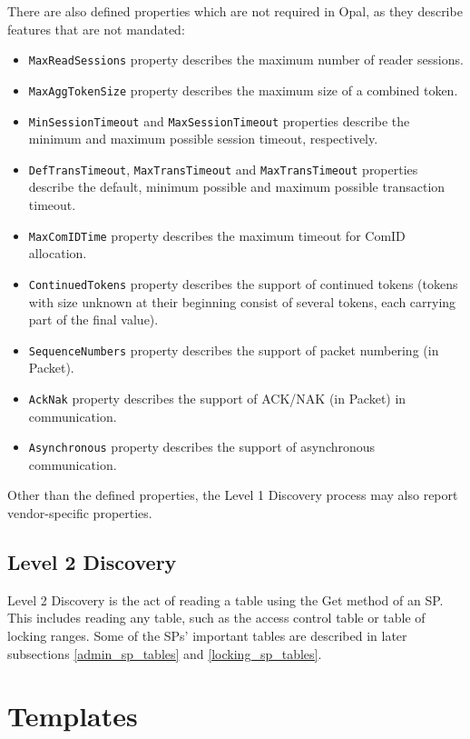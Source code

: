 There are also defined properties which are not required in Opal, as they describe features that are not mandated:
\begin{itemize}
\item \verb|MaxReadSessions| property describes the maximum number of reader sessions.
\item \verb|MaxAggTokenSize| property describes the maximum size of a combined token.
\item \verb|MinSessionTimeout| and \verb|MaxSessionTimeout| properties describe the minimum and maximum possible session timeout, respectively.
\item \verb|DefTransTimeout|, \verb|MaxTransTimeout| and \verb|MaxTransTimeout| properties describe the default, minimum possible and maximum possible transaction timeout.
\item \verb|MaxComIDTime| property describes the maximum timeout for ComID allocation.
\item \verb|ContinuedTokens| property describes the support of continued tokens (tokens with size unknown at their beginning consist of several tokens, each carrying part of the final value).
\item \verb|SequenceNumbers| property describes the support of packet numbering (in Packet).
\item \verb|AckNak| property describes the support of ACK/NAK (in Packet) in communication.
\item \verb|Asynchronous| property describes the support of asynchronous communication.
\end{itemize}

Other than the defined properties, the Level 1 Discovery process may also report vendor-specific properties.

\subsection{Level 2 Discovery}

Level 2 Discovery is the act of reading a table using the Get method of an SP. This includes reading any table, such as the access control table or table of locking ranges. Some of the SPs' important tables are described in later subsections \ref{admin_sp_tables} and \ref{locking_sp_tables}.


\section{Templates}
\label{templates}

